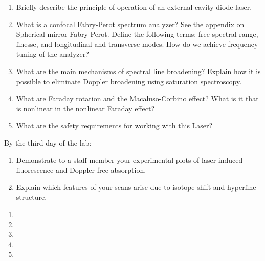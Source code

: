\documentclass{../signatures}
\begin{document}
\maketitle

\names

\prelab

\begin{enumerate}

    \item Briefly describe the principle of operation of an external-cavity diode laser.
    
    \item What is a confocal Fabry-Perot spectrum analyzer? See the appendix on Spherical mirror Fabry-Perot. Define the following terms: free spectral range, finesse, and longitudinal and transverse modes. How do we achieve frequency tuning of the analyzer?

    \item What are the main mechanisms of spectral line broadening? Explain how it is possible to eliminate Doppler broadening using saturation spectroscopy.

    \item What are Faraday rotation and the Macaluso-Corbino effect? What is it that is nonlinear in the nonlinear Faraday effect?

    \item What are the safety requirements for working with this Laser?
       \\[36pt]
\end{enumerate}

\prelabsignatures

\midlab

By the third day of the lab:

\begin{enumerate}

    \item Demonstrate to a staff member your experimental plots of laser-induced fluorescence and Doppler-free absorption.
    
    \item Explain which features of your scans arise due to isotope shift and hyperfine structure.
\\[36pt]
\end{enumerate}


\checkpointsection 

\begin{enumerate}

\item {}

\item {}

\item {}

\item {}

\item {}

\end{enumerate}
\end{document}

